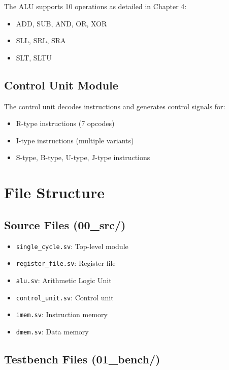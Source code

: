 The ALU supports 10 operations as detailed in Chapter 4:

\begin{itemize}
    \item ADD, SUB, AND, OR, XOR
    \item SLL, SRL, SRA
    \item SLT, SLTU
\end{itemize}

\subsection{Control Unit Module}

The control unit decodes instructions and generates control signals for:

\begin{itemize}
    \item R-type instructions (7 opcodes)
    \item I-type instructions (multiple variants)
    \item S-type, B-type, U-type, J-type instructions
\end{itemize}

\section{File Structure}

\subsection{Source Files (00\_src/)}

\begin{itemize}
    \item \texttt{single\_cycle.sv}: Top-level module
    \item \texttt{register\_file.sv}: Register file
    \item \texttt{alu.sv}: Arithmetic Logic Unit
    \item \texttt{control\_unit.sv}: Control unit
    \item \texttt{imem.sv}: Instruction memory
    \item \texttt{dmem.sv}: Data memory
\end{itemize}

\subsection{Testbench Files (01\_bench/)}

